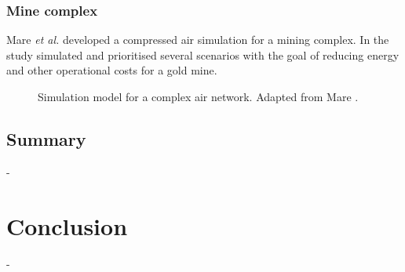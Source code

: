 \subsubsection{Mine complex}
Mare \textit{et al.} \cite{Mare2017Evaluating} developed a compressed air simulation for a mining complex. In the study \cite{Mare2017Evaluating} simulated and prioritised several scenarios with the goal of reducing energy and other operational costs for a gold mine.
\begin{figure}[h!]
	\centering
	\caption[Simulation model for a complex air network.]{Simulation model for a complex air network. Adapted from Mare \cite{Mare2017Evaluating}.}
	\label{fig:Mare model}
\end{figure}		
	\subsection{Summary}-
	\label{Shortcomings of previous work}
\section{Conclusion}-